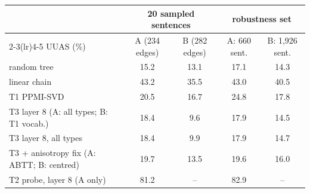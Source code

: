 \begin{tabular}{lcccc}
\toprule
 & \multicolumn{2}{c}{20 sampled sentences} & \multicolumn{2}{c}{robustness set} \\
\cmidrule(lr){2-3}\cmidrule(lr){4-5}
UUAS (\%) & A (234 edges) & B (282 edges) & A: 660 sent. & B: 1,926 sent. \\
\midrule
random tree & 15.2 & 13.1 & 17.1 & 14.3 \\
linear chain & 43.2 & 35.5 & 43.0 & 40.5 \\
\midrule T1 PPMI-SVD & 20.5 & 16.7 & 24.8 & 17.8 \\
T3 layer 8 (A: all types; B: T1 vocab.) & 18.4 & 9.6 & 17.9 & 14.5 \\
T3 layer 8, all types & 18.4 & 9.9 & 17.9 & 14.7 \\
T3 + anisotropy fix (A: ABTT; B: centred) & 19.7 & 13.5 & 19.6 & 16.0 \\
\midrule T2 probe, layer 8 (A only) & 81.2 & -- & 82.9 & -- \\
\bottomrule
\end{tabular}
